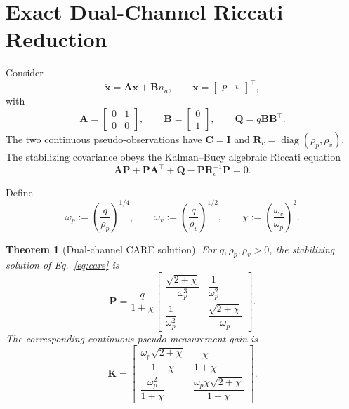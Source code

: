 \documentclass[conference]{IEEEtran}
\newtheorem{theorem}{Theorem}
\newcommand{\vct}[1]{\bm{#1}}
\newcommand{\mat}[1]{\bm{#1}}
\newcommand{\Id}{\mat I}
\begin{document}
\section{Exact Dual-Channel Riccati Reduction}
\label{sec:care}

Consider
\begin{equation}
 \dot{\vct x}=\mat A\vct x+\mat B n_a,
 \qquad
 \vct x=\begin{bmatrix}p&v\end{bmatrix}^{\top},
\end{equation}
with
\begin{equation}
 \mat A=\begin{bmatrix}0&1\\0&0\end{bmatrix},
 \qquad
 \mat B=\begin{bmatrix}0\\1\end{bmatrix},
 \qquad
 \mat Q=q\mat B\mat B^{\top}.
\end{equation}
The two continuous pseudo-observations have $\mat C=\Id$ and
$\mat R_c=\operatorname{diag}(\rho_p,\rho_v)$. The stabilizing covariance obeys
the Kalman--Bucy algebraic Riccati equation
\cite{KalmanBucy1961,Jazwinski1970,SarkkaSvensson2023,Anderson1971}
\begin{equation}
 \mat A\mat P+\mat P\mat A^{\top}+\mat Q
 -\mat P\mat R_c^{-1}\mat P=0.
 \label{eq:care}
\end{equation}

Define
\begin{equation}
 \omega_p:=\left(\frac{q}{\rho_p}\right)^{1/4},
 \qquad
 \omega_v:=\left(\frac{q}{\rho_v}\right)^{1/2},
 \qquad
 \chi:=\left(\frac{\omega_v}{\omega_p}\right)^2.
 \label{eq:natural-frequencies}
\end{equation}

\begin{theorem}[Dual-channel CARE solution]
For $q,\rho_p,\rho_v>0$, the stabilizing solution of
Eq.~\eqref{eq:care} is
\begin{equation}
 \boxed{
 \mat P=\frac{q}{1+\chi}
 \begin{bmatrix}
 \dfrac{\sqrt{2+\chi}}{\omega_p^3} & \dfrac{1}{\omega_p^2}\\[2.5mm]
 \dfrac{1}{\omega_p^2} & \dfrac{\sqrt{2+\chi}}{\omega_p}
 \end{bmatrix}.}
 \label{eq:P-solution}
\end{equation}
The corresponding continuous pseudo-measurement gain is
\begin{equation}
 \boxed{
 \mat K=
 \begin{bmatrix}
 \dfrac{\omega_p\sqrt{2+\chi}}{1+\chi} & \dfrac{\chi}{1+\chi}\\[2.5mm]
 \dfrac{\omega_p^2}{1+\chi} &
 \dfrac{\omega_p\chi\sqrt{2+\chi}}{1+\chi}
 \end{bmatrix}.}
\end{equation}
\end{theorem}
\end{document}
